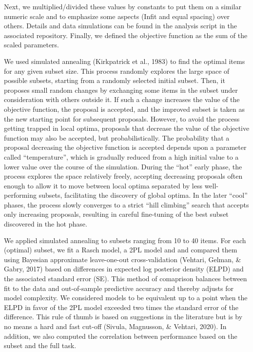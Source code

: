 \documentclass[
  man,floatsintext]{apa6}
\begin{document}
Next, we multiplied/divided these values by constants to put them on a similar numeric scale and to emphasize some aspects (Infit and equal spacing) over others. Details and data simulations can be found in the analysis script in the associated repository. Finally, we defined the objective function as the sum of the scaled parameters.

We used simulated annealing (Kirkpatrick et al., 1983) to find the optimal items for any given subset size. This process randomly explores the large space of possible subsets, starting from a randomly selected initial subset. Then, it proposes small random changes by exchanging some items in the subset under consideration with others outside it. If such a change increases the value of the objective function, the proposal is accepted, and the improved subset is taken as the new starting point for subsequent proposals. However, to avoid the process getting trapped in local optima, proposals that decrease the value of the objective function may also be accepted, but probabilistically. The probability that a proposal decreasing the objective function is accepted depends upon a parameter called ``temperature'', which is gradually reduced from a high initial value to a lower value over the course of the simulation. During the ``hot'' early phase, the process explores the space relatively freely, accepting decreasing proposals often enough to allow it to move between local optima separated by less well-performing subsets, facilitating the discovery of global optima. In the later ``cool'' phases, the process slowly converges to a strict ``hill climbing'' search that accepts only increasing proposals, resulting in careful fine-tuning of the best subset discovered in the hot phase.

We applied simulated annealing to subsets ranging from 10 to 40 items. For each (optimal) subset, we fit a Rasch model, a 2PL model and and compared them using Bayesian approximate leave-one-out cross-validation (Vehtari, Gelman, \& Gabry, 2017) based on differences in expected log posterior density (ELPD) and the associated standard error (SE). This method of comaprison balances between fit to the data and out-of-sample predictive accuracy and thereby adjusts for model complexity. We considered models to be equivalent up to a point when the ELPD in favor of the 2PL model exceeded two times the standard error of the difference. This rule of thumb is based on suggestions in the literature but is by no means a hard and fast cut-off (Sivula, Magnusson, \& Vehtari, 2020). In addition, we also computed the correlation between performance based on the subset and the full task.
\end{document}
